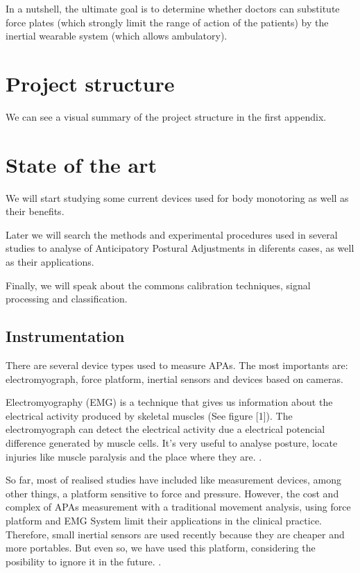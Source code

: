 In a nutshell, the ultimate goal is to determine whether doctors can substitute force plates (which strongly limit the range of action of the patients) by the inertial wearable system (which allows ambulatory).


\section{Project structure}

We can see a visual summary of the project structure in the first appendix.

\section{State of the art}

We will start studying some current devices used for body monotoring as well as their benefits.

Later we will search the methods and experimental procedures used in several studies to analyse of Anticipatory Postural Adjustments in diferents cases, as well as their applications.

Finally, we will speak about the commons calibration techniques, signal processing and classification.


\subsection{Instrumentation}

There are several  device types used to measure APAs. The most importants are: electromyograph, force platform, inertial sensors and devices based on cameras. 

Electromyography (EMG) is a technique that gives us information about the electrical activity produced by skeletal muscles (See figure [1]). The electromyograph can detect  the electrical activity due a electrical potencial difference generated by muscle cells. It’s very useful to analyse posture, locate injuries like muscle paralysis and the place where they are. \cite{Marcio2010} \cite{Instr1}. 


So far, most of realised studies have included like measurement devices, among other things, a platform sensitive to force and pressure. However, the cost and complex of APAs measurement with a traditional movement analysis, using force platform and EMG System limit their applications in the  clinical practice. Therefore, small inertial sensors are used recently because they are cheaper and more portables. But even so, we have used this platform, considering the posibility to ignore it in the future. \cite{Mancini2009} \cite{Vennila2011}.

